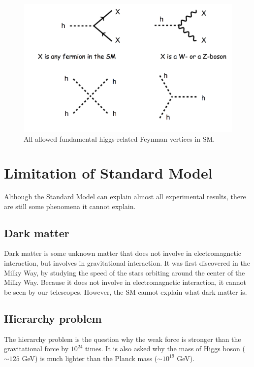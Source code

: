 \begin{figure}
\centering
\includegraphics[width=\textwidth]{data/photo/theory/vertices_higgs.png}
\caption{All allowed fundamental higgs-related Feynman vertices in SM.}
\label{fig:vertices_higgs}
\end{figure}

\section{Limitation of Standard Model}
\label{sec:Limitation_Standard_Model}
Although the Standard Model can explain almost all experimental results, there are still some phenomena it cannot explain.

\subsection{Dark matter}
\label{sec:dark_matter}
Dark matter is some unknown matter that does not involve in electromagnetic interaction, but involves in gravitational interaction.
It was first discovered in the Milky Way, by studying the speed of the stars orbiting around the center of the Milky Way.
Because it does not involve in electromagnetic interaction, it cannot be seen by our telescopes.
However, the SM cannot explain what dark matter is.

\subsection{Hierarchy problem}
\label{subsec:hierarchy_problem}
The hierarchy problem is the question why the weak force is stronger than the gravitational force by $10^{24}$ times.
It is also asked why the mass of Higgs boson ($\sim 125$ GeV) is much lighter than the Planck mass ($\sim 10^{19}$ GeV).

